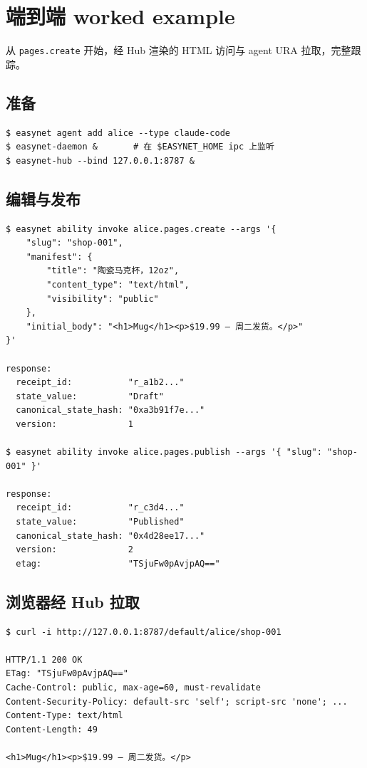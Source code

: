 \documentclass[11pt,a4paper]{article}
\theoremstyle{definition}
\begin{document}
\section{端到端 worked example}
\label{sec:e2e}

从 \texttt{pages.create} 开始，经 Hub 渲染的 HTML 访问与 agent URA
拉取，完整跟踪。

\subsection{准备}

\begin{lstlisting}
$ easynet agent add alice --type claude-code
$ easynet-daemon &       # 在 $EASYNET_HOME ipc 上监听
$ easynet-hub --bind 127.0.0.1:8787 &
\end{lstlisting}

\subsection{编辑与发布}

\begin{lstlisting}
$ easynet ability invoke alice.pages.create --args '{
    "slug": "shop-001",
    "manifest": {
        "title": "陶瓷马克杯，12oz",
        "content_type": "text/html",
        "visibility": "public"
    },
    "initial_body": "<h1>Mug</h1><p>$19.99 — 周二发货。</p>"
}'

response:
  receipt_id:           "r_a1b2..."
  state_value:          "Draft"
  canonical_state_hash: "0xa3b91f7e..."
  version:              1

$ easynet ability invoke alice.pages.publish --args '{ "slug": "shop-001" }'

response:
  receipt_id:           "r_c3d4..."
  state_value:          "Published"
  canonical_state_hash: "0x4d28ee17..."
  version:              2
  etag:                 "TSjuFw0pAvjpAQ=="
\end{lstlisting}

\subsection{浏览器经 Hub 拉取}

\begin{lstlisting}
$ curl -i http://127.0.0.1:8787/default/alice/shop-001

HTTP/1.1 200 OK
ETag: "TSjuFw0pAvjpAQ=="
Cache-Control: public, max-age=60, must-revalidate
Content-Security-Policy: default-src 'self'; script-src 'none'; ...
Content-Type: text/html
Content-Length: 49

<h1>Mug</h1><p>$19.99 — 周二发货。</p>
\end{lstlisting}
\end{document}
